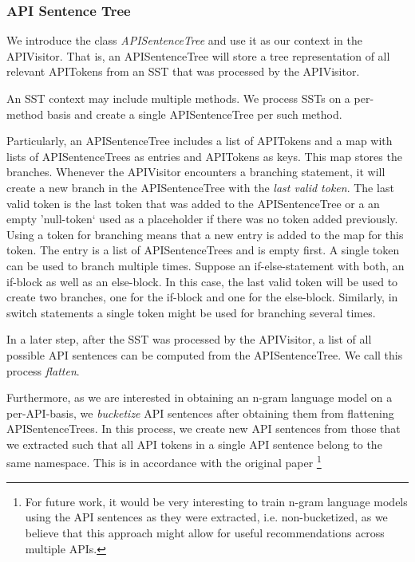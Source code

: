\subsubsection{API Sentence Tree}
\label{section-apisentencetree}

We introduce the class \textit{APISentenceTree} and use it as our context in the APIVisitor. That is, an APISentenceTree will store a tree representation of all relevant APITokens from an SST that was processed by the APIVisitor.

An SST context may include multiple methods. We process SSTs on a per-method basis and create a single APISentenceTree per such method.

Particularly, an APISentenceTree includes a list of APITokens and a map with lists of APISentenceTrees as entries and APITokens as keys. This map stores the branches.
Whenever the APIVisitor encounters a branching statement, it will create a new branch in the APISentenceTree with the \textit{last valid token}. The last valid token is the last token that was added to the APISentenceTree or a an empty 'null-token` used as a placeholder if there was no token added previously.
Using a token for branching means that a new entry is added to the map for this token.
The entry is a list of APISentenceTrees and is empty first.
A single token can be used to branch multiple times. Suppose an if-else-statement with both, an if-block as well as an else-block. In this case, the last valid token will be used to create two branches, one for the if-block and one for the else-block.
Similarly, in switch statements a single token might be used for branching several times.

In a later step, after the SST was processed by the APIVisitor, a list of all possible API sentences can be computed from the APISentenceTree. We call this process \textit{flatten}.

Furthermore, as we are interested in obtaining an n-gram language model on a per-API-basis, we \textit{bucketize} API sentences after obtaining them from flattening APISentenceTrees. In this process, we create new API sentences from those that we extracted such that all API tokens in a single API sentence belong to the same namespace.
This is in accordance with the original paper \cite{Santos2017stepwise}\footnote{For future work, it would be very interesting to train n-gram language models using the API sentences as they were extracted, i.e. non-bucketized, as we believe that this approach might allow for useful recommendations across multiple APIs.}



